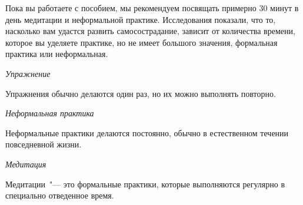 	Пока вы работаете с пособием, мы рекомендуем посвящать примерно 30 минут в день медитации и неформальной практике. Исследования показали, что то, насколько вам удастся развить самосострадание, зависит от количества времени, которое вы уделяете практике, но не имеет большого значения, формальная практика или неформальная.  
	
	\newpage
	
	
	\colorbox{light-blue}{\Large\textit{Упражнение}}
	
	\vspace{2ex}
	
	Упражнения обычно делаются один раз, но их можно выполнять повторно.
	
	\vspace{5ex}
	
	\colorbox{light-green}{\Large\textit{Неформальная практика}}
	
	\vspace{2ex}
	
	Неформальные практики делаются постоянно, обычно в естественном течении повседневной жизни.
	
	\vspace{5ex}
	
	\colorbox{light-ping}{\Large\textit{Медитация}}
		
	\vspace{2ex}
		
	Медитации~"--- это формальные практики, которые выполняются регулярно в специально отведенное время. 
	
